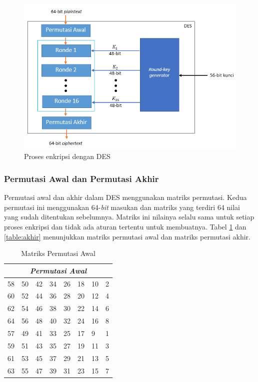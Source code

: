 \begin{figure}[h]
\includegraphics[scale=0.6]{Gambar/DES}%
\centering
\caption{Proses enkripsi dengan DES}
\end{figure}

\subsubsection{Permutasi Awal dan Permutasi Akhir}
Permutasi awal dan akhir dalam DES menggunakan matriks permutasi. Kedua permutasi ini menggunakan 64-\textit{bit} masukan dan matriks yang terdiri 64 nilai yang sudah ditentukan sebelumnya. Matriks ini nilainya selalu sama untuk setiap proses enkripsi dan tidak ada aturan tertentu untuk membuatnya. Tabel \ref{table:awal} dan \ref{table:akhir} menunjukkan matriks permutasi awal dan matriks permutasi akhir.


\begin{table}
	\begin{center}
		\begin{tabular}{|l|l|l|l|l|l|l|l|}
				\hline
				\multicolumn{8}{|c|}{\textit{Permutasi Awal}} \\
				\hline
				58	&	50	&	42	&	34	&	26	&	18	&	10	&	2	\\ \hline
				60	&	52	&	44	&	36	&	28	&	20	&	12	&	4	\\ \hline
				62	&	54	&	46	&	38	&	30	&	22	&	14	&	6	\\ \hline
				64	&	56	&	48	&	40	&	32	&	24	&	16	&	8	\\ \hline
				57	&	49	&	41	&	33	&	25	&	17	&	9	&	1		\\ \hline
				59	&	51	&	43	&	35	&	27	&	19	&	11	&	3	\\ \hline
				61	&	53	&	45	&	37	&	29	&	21	&	13	&	5	\\ \hline
				63	&	55	&	47	&	39	&	31	&	23	&	15	&	7	\\ \hline
		\end{tabular}
	\end{center}
	\caption{Matriks Permutasi Awal}\label{table:awal}
\end{table}

